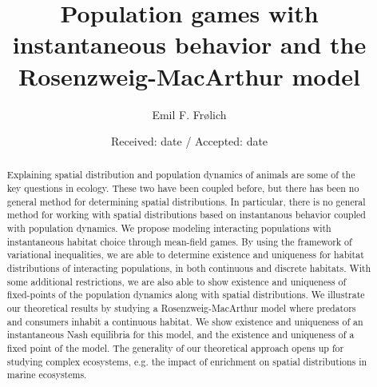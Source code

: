 \documentclass[referee,natbib,smallcondensed]{svjour3}     %
\begin{document}
\title{Population games with instantaneous behavior and the Rosenzweig-MacArthur model
}


\author{Emil F. Fr{\o}lich
}



\date{Received: date / Accepted: date}


\maketitle
\newpage
\begin{abstract}
  Explaining spatial distribution and population dynamics of animals are some of the key questions in ecology. These two have been coupled before, but there has been no general method for determining spatial distributions. In particular, there is no general method for working with spatial distributions based on instantanous behavior coupled with population dynamics. We propose modeling interacting populations with instantaneous habitat choice through mean-field games. By using the framework of variational inequalities, we are able to determine existence and uniqueness for habitat distributions of interacting populations, in both continuous and discrete habitats. With some additional restrictions, we are also able to show existence and uniqueness of fixed-points of the population dynamics along with spatial distributions. We illustrate our theoretical results by studying a Rosenzweig-MacArthur model where predators and consumers inhabit a continuous habitat. We show existence and uniqueness of an instantaneous Nash equilibria for this model, and the existence and uniqueness of a fixed point of the model.
  The generality of our theoretical approach opens up for studying complex ecosystems, e.g. the impact of enrichment on spatial distributions in marine ecosystems.

\end{abstract}
\end{document}
